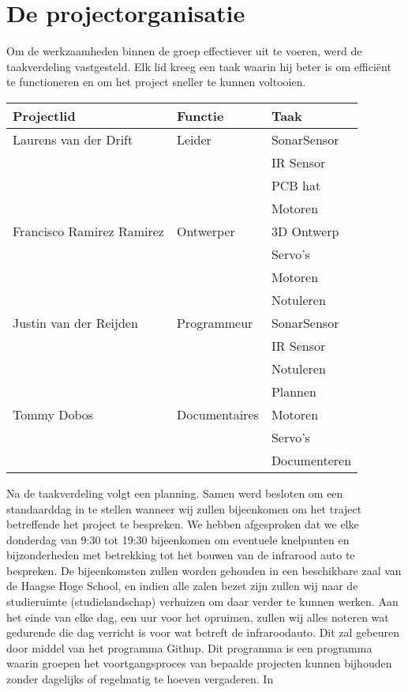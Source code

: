 \section{De projectorganisatie}
Om de werkzaamheden binnen de groep effectiever uit te voeren, werd de taakverdeling vastgesteld. Elk lid kreeg een taak waarin hij beter is om efficiënt te functioneren en om het project sneller te kunnen voltooien.


\begin{table}[h]
\begin{tabular}{|l|l|l|}
\hline
\rowcolor[HTML]{9B9B9B} 
{\color[HTML]{FFFFFF} \textbf{Projectlid}} & {\color[HTML]{FFFFFF} \textbf{Functie}} & {\color[HTML]{FFFFFF} \textbf{Taak}} \\ \hline
\rowcolor[HTML]{EFEFEF} 
Laurens van der Drift & Leider & SonarSensor \\ \hline
 &  & IR Sensor \\ \hline
 &  & \cellcolor[HTML]{EFEFEF}PCB hat \\ \hline
 &  & Motoren \\ \hline
\rowcolor[HTML]{EFEFEF} 
Francisco Ramirez Ramirez & Ontwerper & 3D   Ontwerp \\ \hline
 &  & Servo's \\ \hline
 &  & \cellcolor[HTML]{EFEFEF}Motoren \\ \hline
 &  & Notuleren \\ \hline
\rowcolor[HTML]{EFEFEF} 
Justin   van der Reijden & Programmeur & SonarSensor \\ \hline
 &  & IR Sensor \\ \hline
 &  & \cellcolor[HTML]{EFEFEF}Notuleren \\ \hline
 &  & Plannen \\ \hline
\rowcolor[HTML]{EFEFEF} 
Tommy Dobos & Documentaires & Motoren \\ \hline
 &  & Servo's \\ \hline
 &  & \cellcolor[HTML]{EFEFEF}Documenteren \\ \hline
\end{tabular}
\end{table}

Na de taakverdeling volgt een planning. Samen werd besloten om een standaarddag in te stellen wanneer wij zullen bijeenkomen om het traject betreffende het project te bespreken. We hebben afgesproken dat we elke donderdag van 9:30 tot 19:30 bijeenkomen om eventuele knelpunten en bijzonderheden met betrekking tot het bouwen van de infrarood auto te bespreken. De bijeenkomsten zullen worden gehouden in een beschikbare zaal van de Haagse Hoge School, en indien alle zalen bezet zijn zullen wij naar de studieruimte (studielandschap) verhuizen om daar verder te kunnen werken.
Aan het einde van elke dag, een uur voor het opruimen, zullen wij alles noteren wat gedurende die dag verricht is voor wat betreft de infraroodauto. Dit zal gebeuren door middel van het programma Githup. Dit programma is een programma waarin groepen het voortgangsproces van bepaalde projecten kunnen bijhouden zonder dagelijks of regelmatig te hoeven vergaderen. In 